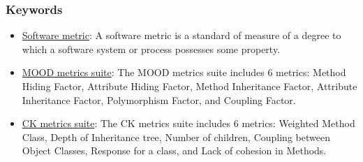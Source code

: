 \documentclass[conference]{IEEEtran}
\begin{document}
\subsubsection{\textbf{Keywords}}
\begin{itemize}
    \item \underline{Software metric}: A software metric is a standard of measure of a degree to which a software system or process possesses some property.
    \item \underline{MOOD metrics suite}: The MOOD metrics suite includes 6 metrics: Method Hiding Factor, Attribute Hiding Factor, Method Inheritance Factor, Attribute Inheritance Factor, Polymorphism Factor, and Coupling Factor.
    \item \underline{CK metrics suite}: The CK metrics suite includes 6 metrics: Weighted Method Class, Depth of Inheritance tree, Number of children, Coupling between Object Classes, Response for a class, and Lack of cohesion in Methods.
\end{itemize}
\end{document}
